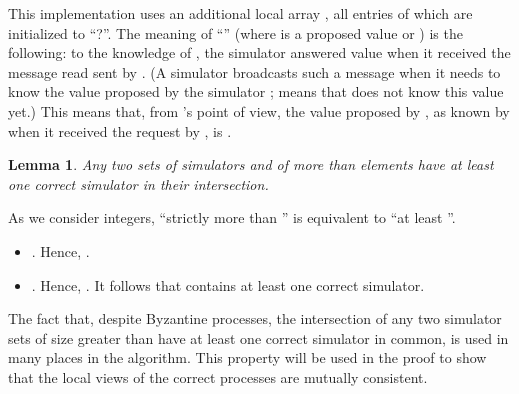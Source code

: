 \documentclass[11pt,letterpaper]{article}
\newtheorem{lemma}{Lemma}
\newlength {\afterproof}
\newcommand{\toto}{xxx}
\newenvironment{proofL}{\noindent{\bf Proof }}
{\hspace*{\fill}\par\vspace{\afterproof}}
\begin{document}
This implementation uses an additional local array
, all entries of which are initialized to
``?''. The meaning of  ``'' 
(where  is a proposed value or ) is the following:
to the knowledge of , the simulator  answered  value  when
it received  the message {\sc read} sent by .
(A simulator  broadcasts such a message when it needs to know the value
proposed by  the simulator ;  means that  does not 
know this value yet.) This  means that, from  's point of
view, the value proposed by , as known by  when it received 
the request by , is .



\begin{lemma}
\label{lemma:quorum-intersection}
Any two sets of simulators  and  of more than 
elements have at least one correct simulator in their intersection.
\end{lemma}

\begin{proofL}
As  we   consider  integers,  ``strictly  more  than  ''
is equivalent to ``at least ''.

 \begin{itemize}
\vspace{-0.2cm}
\item
. Hence, .
\vspace{-0.2cm}
\item
.
Hence,  . It follows that  
contains at least one correct simulator.
\end{itemize}
\vspace{-0.4cm}
\renewcommand{\toto}{lemma:quorum-intersection}
\end{proofL}


The fact that, despite Byzantine processes,  the intersection of any two
simulator  sets of  size greater than  have at least one
correct simulator in common, is used in many places in the algorithm.
This property will be used in the proof to show that the local views
of the correct processes are mutually consistent.
\end{document}
